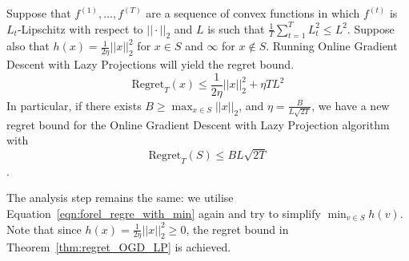 \begin{theorem}\label{thm:regret_OGD_LP}
    Suppose that $f^{(1)}, \ldots, f^{(T)}$ are a sequence of convex functions in which $f^{(t)}$ is $L_t$-Lipschitz with respect to $||\cdot||_2$ and $L$ is such that $\frac{1}{T}\sum_{t=1}^T L_t^2 \leq L^2$. Suppose also that $h(x)= \frac{1}{2\eta} ||x||_2^2$ for $ x \in S$ and $\infty$ for $x \notin S$. Running Online Gradient Descent with Lazy Projections will yield the regret bound.
    \begin{equation}
       \text{Regret}_T(x) \leq \frac{1}{2\eta}||x||_2^2 + \eta TL^2
    \end{equation}
    In particular, if there exists $B \geq \max_{x \in S}||x||_2$, and $\eta = \frac{B}{L\sqrt{2T}}$, we have a new regret bound for the Online Gradient Descent with Lazy Projection algorithm with 
        $$\text{Regret}_T(S) \leq BL \sqrt{2T}$$.
\end{theorem}
The analysis step remains the same: we utilise Equation~\ref{eqn:forel_regre_with_min} again and try to simplify $\min_{v \in S} h(v)$. Note that since $h(x) =\frac{1}{2\eta}||x||_2^2 \geq 0$, the regret bound in Theorem~\ref{thm:regret_OGD_LP} is achieved.
